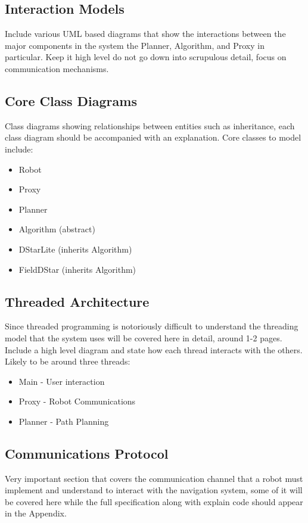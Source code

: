 \subsection{Interaction Models}
Include various UML based diagrams that show the interactions between the major components in the system the Planner, Algorithm, and Proxy in particular. Keep it high level do not go down into scrupulous detail, focus on communication mechanisms. 

\subsection{Core Class Diagrams}

\noindent
Class diagrams showing relationships between entities such as inheritance, each class diagram should be accompanied with an explanation. Core classes to model include:

\begin{itemize}
\item Robot
\item Proxy
\item Planner
\item Algorithm (abstract)
\item DStarLite (inherits Algorithm)
\item FieldDStar (inherits Algorithm)
\end{itemize} 

\newpage

\subsection{Threaded Architecture}

\noindent
Since threaded programming is notoriously difficult to understand the threading model that the system uses will be covered here in detail, around 1-2 pages. Include a high level diagram and state how each thread interacts with the others. Likely to be around three threads:

\begin{itemize}
\item Main - User interaction
\item Proxy - Robot Communications
\item Planner - Path Planning
\end{itemize} 

\subsection{Communications Protocol}
Very important section that covers the communication channel that a robot must implement and understand to interact with the navigation system, some of it will be covered here while the full specification along with explain code should appear in the Appendix.

